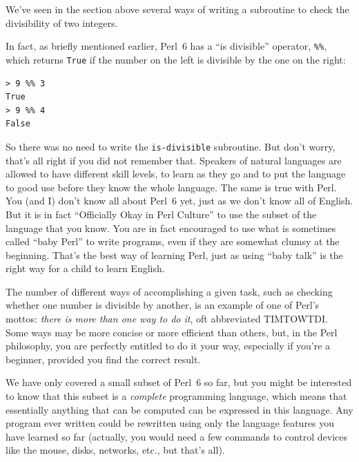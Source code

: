 We've seen in the section above several ways of writing a 
subroutine to check the divisibility of two integers.

In fact, as briefly mentioned earlier, Perl~6 has a 
``is divisible'' operator, \verb'%%', which returns 
{\tt True} if the number on the left is divisible by 
the one on the right:

\begin{verbatim}
> 9 %% 3
True
> 9 %% 4
False
\end{verbatim}

So there was no need to write the {\tt is-divisible} subroutine. 
But don't worry, that's all right if you did not remember that. 
Speakers of natural languages are allowed to have different 
skill levels, to learn as they go and to put the language 
to good use before they know the whole language. The same 
is true with Perl. You (and I) don't know all about Perl~6 
yet, just as we don't know all of English. But it is in fact 
``Officially Okay in Perl Culture'' to use the subset of 
the language that you know. You are in fact 
encouraged to use what is sometimes called ``baby Perl'' 
to write programs, even if they are somewhat clumsy at the 
beginning. That's the best way of learning Perl, just as using 
``baby talk'' is the right way for a child to learn English.

The number of different ways of accomplishing a given task, 
such as checking whether one number is divisible 
by another, is an example of one of Perl's mottos: 
\emph{there is more than 
one way to do it}, oft abbreviated TIMTOWTDI. Some ways may be 
more concise or more efficient than others, but, in the Perl 
philosophy, you are perfectly entitled to do it your way, 
especially if you're a beginner, provided you find the correct 
result.

We have only covered a small subset of Perl~6 so far, but you 
might be interested to know that this subset is a {\em complete}
programming language, which means that essentially anything 
that can be computed can be expressed in this language.  
Any program ever written could be rewritten using only the 
language features you have learned so far (actually, you 
would need a few commands to control devices like the mouse, 
disks, networks, etc., but that's all).

